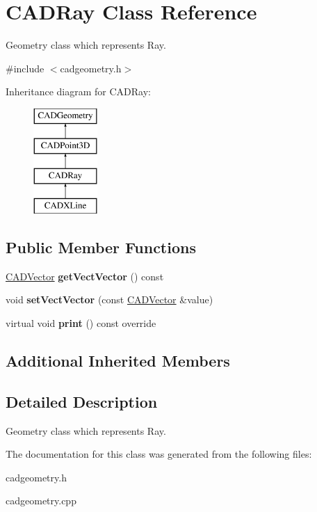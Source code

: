 \hypertarget{class_c_a_d_ray}{}\section{C\+A\+D\+Ray Class Reference}
\label{class_c_a_d_ray}


Geometry class which represents Ray.  




{\ttfamily \#include $<$cadgeometry.\+h$>$}

Inheritance diagram for C\+A\+D\+Ray\+:\begin{figure}[H]
\begin{center}
\leavevmode
\includegraphics[height=4.000000cm]{class_c_a_d_ray}
\end{center}
\end{figure}
\subsection*{Public Member Functions}
\begin{DoxyCompactItemize}
\item 
\hyperlink{class_c_a_d_vector}{C\+A\+D\+Vector} {\bfseries get\+Vect\+Vector} () const \hypertarget{class_c_a_d_ray_addee3ba39cf76fae3a2e9a1363404a52}{}\label{class_c_a_d_ray_addee3ba39cf76fae3a2e9a1363404a52}

\item 
void {\bfseries set\+Vect\+Vector} (const \hyperlink{class_c_a_d_vector}{C\+A\+D\+Vector} \&value)\hypertarget{class_c_a_d_ray_a8b0b0877579718e78f88895204656952}{}\label{class_c_a_d_ray_a8b0b0877579718e78f88895204656952}

\item 
virtual void {\bfseries print} () const  override\hypertarget{class_c_a_d_ray_a0d2b2fc382553034b16e6564f7b263e4}{}\label{class_c_a_d_ray_a0d2b2fc382553034b16e6564f7b263e4}

\end{DoxyCompactItemize}
\subsection*{Additional Inherited Members}


\subsection{Detailed Description}
Geometry class which represents Ray. 

The documentation for this class was generated from the following files\+:\begin{DoxyCompactItemize}
\item 
cadgeometry.\+h\item 
cadgeometry.\+cpp\end{DoxyCompactItemize}
